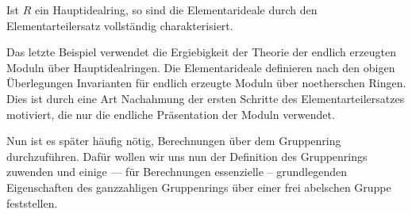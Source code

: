         \begin{bsp}
        \label{bsp:hauptidealelementarteiler}
            Ist $R$ ein Hauptidealring, so sind die Elementarideale durch den Elementarteilersatz vollständig charakterisiert.
        \end{bsp}
        \begin{bem}
        	Das letzte Beispiel verwendet die Ergiebigkeit der Theorie der endlich erzeugten Moduln über Hauptidealringen. Die Elementarideale definieren nach den obigen Überlegungen Invarianten für endlich erzeugte Moduln über noetherschen Ringen. Dies ist durch eine Art Nachahmung der ersten Schritte des Elementarteilersatzes motiviert, die nur die endliche Präsentation der Moduln verwendet.
        \end{bem}

    Nun ist es später häufig nötig, Berechnungen über dem Gruppenring durchzuführen. Dafür wollen wir uns nun der Definition des Gruppenrings zuwenden und einige --- für Berechnungen essenzielle -- grundlegenden Eigenschaften des ganzzahligen Gruppenrings über einer frei abelschen Gruppe feststellen.


